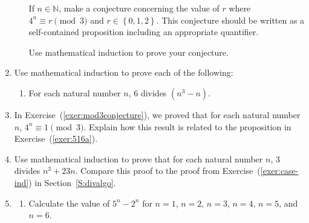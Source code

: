 \begin{enumerate}
\begin{enumerate}
\yitem If  $n \in \mathbb{N}$, make a conjecture concerning the value of  $r$  where  \\
$4^n  \equiv r \pmod 3$  and  $r \in \left\{ {0,1,2} \right\}$.  This conjecture should be written as a self-contained proposition including an appropriate quantifier.

\yitem Use mathematical induction to prove your conjecture.

\end{enumerate}




\item Use mathematical induction to prove each of the following: \label{exer:sec51-6}
\begin{enumerate}
  \yitem For each natural number  $n$,  3 divides $\left( {4^n  - 1} \right)$. \label{exer:516a}

  \item For each natural number  $n$,  6 divides $\left( {n^3  - n} \right)$.
\end{enumerate}


\item In Exercise~(\ref{exer:mod3conjecture}), we proved that for each natural number  $n$,  
$4^n  \equiv 1 \pmod 3$.    Explain how this result is related to the proposition in Exercise~(\ref{exer:516a}).


\item Use mathematical induction to prove that for each natural number $n$, 3 divides 
$n^3 + 23n$.  Compare this proof to the proof from Exercise~(\ref{exer:case-ind}) in Section~\ref{S:divalgo}.


\item \label{exer:sec51-8}
\begin{enumerate} 
\item Calculate the value of $5^n - 2^n$ for $n = 1$, $n = 2$, $n = 3$, $n = 4$, $n = 5$, and 
$n = 6$. \label{exer:sec51-8a}
%


\end{enumerate}
\end{enumerate}
